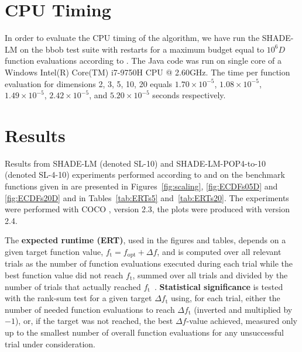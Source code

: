 \documentclass[sigconf]{acmart}
\newcommand{\Df}{\ensuremath{\Delta f}}
\newcommand{\fopt}{\ensuremath{f_\mathrm{opt}}}
\newcommand{\ftarget}{\ensuremath{f_\mathrm{t}}}
\begin{document}
%
\section{CPU Timing}
In order to evaluate the CPU timing of the algorithm, we have run the {SHADE-LM}
on the {bbob test suite \cite{hansen2010fun}} with restarts for a maximum budget
equal to {$10^6D$} function evaluations according to \cite{hansen2016exp}.
The {Java} code was run on  single core of a {Windows Intel(R) Core(TM) i7-9750H CPU @ 2.60GHz}.
The time per function evaluation for dimensions 2, 3, 5, 10, 20 equals
$1.70\times10^{-5}$,
{$1.08\times10^{-5}$},
{$1.49\times10^{-5}$},
{$2.42\times10^{-5}$},
and {$5.20\times10^{-5}$}
seconds respectively. 

\section{Results}

Results from SHADE-LM (denoted SL-10) and SHADE-LM-POP4-to-10 (denoted SL-4-10) experiments performed according to \cite{hansen2016exp} and \cite{hansen2016perfass} on the
benchmark functions given in \cite{wp200901_2010,hansen2010fun} are
presented in Figures~\ref{fig:scaling}, \ref{fig:ECDFs05D} and
\ref{fig:ECDFs20D} and in Tables~\ref{tab:ERTs5} and~\ref{tab:ERTs20}.
The experiments were performed with COCO \cite{hansen2020cocoplat}, version
{2.3}, the plots were produced with version {2.4}.

The \textbf{expected runtime (ERT)}, used in the figures and tables,
depends on a given target function value, $\ftarget=\fopt+\Df$, and is
computed over all relevant trials as the number of function
evaluations executed during each trial while the best function value
did not reach \ftarget, summed over all trials and divided by the
number of trials that actually reached \ftarget\
\cite{hansen2012exp,price1997dev}.  \textbf{Statistical significance}
is tested with the rank-sum test for a given target $\Delta\ftarget$
using, for each trial,
either the number of needed function evaluations to reach
$\Delta\ftarget$ (inverted and multiplied by $-1$), or, if the target
was not reached, the best $\Df$-value achieved, measured only up to
the smallest number of overall function evaluations for any
unsuccessful trial under consideration.
\end{document}
